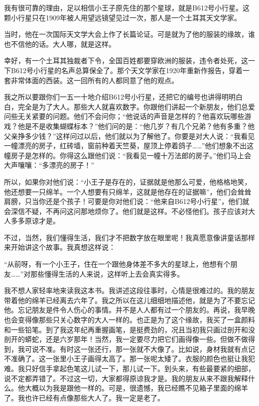 我有很可靠的理由，足以相信小王子原先住的那个星球，就是B612号小行星。这颗小行星只在1909年被人用望远镜望见过一次，那人是一个土耳其天文学家。

{\startalignment[center]
 \stopalignment}

{\startalignment[center]
 \stopalignment}

当时，他在一次国际天文学大会上作了长篇论证。可是就为了他的服装的缘故，谁也不信他的话。大人哪，就是这样。

幸好，有一个土耳其独裁者下令，全国百姓都要穿欧洲的服装，违令者处死，这一下B612号小行星的名声总算保全了。那个天文学家在1920年重新作报告，穿着一套非常体面的西装。这一回所有的人都同意了他的观点。

{\startalignment[center]
 \stopalignment}

我之所以要跟你们一五一十地介绍B612号小行星，还把它的编号也讲得明明白白，完全是为了大人。那些大人就喜欢数字。你跟他们讲起一个新朋友，他们总爱问些无关紧要的问题。他们不会问你；“他说话的声音是怎样的？他喜欢玩哪些游戏？他是不是收集蝴蝶标本？”他们问的是：“他几岁？有几个兄弟？他有多重？他父亲挣多少钱？”这样问过以后，他们就以为了解他了。你要是对大人说：“我看见一幢漂亮的房子，红砖墙，窗前种着天竺葵，屋顶上停着鸽子\ldots{}\ldots{}”他们想象不出这幢房子是怎样的。你得这么跟他们说：“我看见一幢十万法郎的房子。”他们马上会大声嚷嚷：“多漂亮的房子！”

所以，如果你对他们说：“小王子是存在的，证据就是他那么可爱，他格格地笑，他还想要一只绵羊。一个人想要有只绵羊，这就是他存在的证据嘛”，他们会耸耸肩膀，只当你还是个孩子！可要是你对他们说：“他来自B612号小行星”，他们就会深信不疑，不再问这问那地烦你了。他们就是这样。不必怪他们。孩子应该对大人多多原谅才是。

不过，当然，我们懂得生活，我们才不把数字放在眼里呢！我真愿意像讲童话那样来开始讲这个故事。我真想这样说：

“从前呀，有一个小王子，住在一个跟他身体差不多大的星球上，他想有个朋友\ldots{}\ldots{}”对那些懂得生活的人来说，这样听上去会真实得多。

我不想人家轻率地来读我这本书。我讲述这段往事时，心情是很难过的。我的朋友带着他的绵羊已经离去六年了。我之所以在这儿细细地描述他，就是为了不要忘记他。忘记朋友是件令人伤心的事情。并不是人人都有过一个朋友的。再说，我早晚也会变得像那些只关心数字的大人一样的。也正是为了这个缘故，我买了一盒颜料和一些铅笔。到了我这年纪再重握画笔，是挺费劲的，况且当初我只画过剖开和没剖开的蟒蛇，还是六岁那年！当然，我一定要尽力把它们画得像一些。但做不做得到，我可说不准。有时这一张还行，那一张就不大像了。比如说，身材我就有点记不准确了。这一张里小王子画得太高了。那一张呢太矮了。衣服的颜色也挺让我犯难。我只好信手拿起色笔这儿试一下，那儿试一下。到头来，有些最要紧的细部，说不定都弄错了。不过这一切，大家都得原谅我才是。我的朋友从来不跟我解释什么。他大概以为我是跟他一样的。可是，很遗憾，我已经瞧不见箱子里面的绵羊了。我也许已经有点像那些大人了。我一定是老了。


